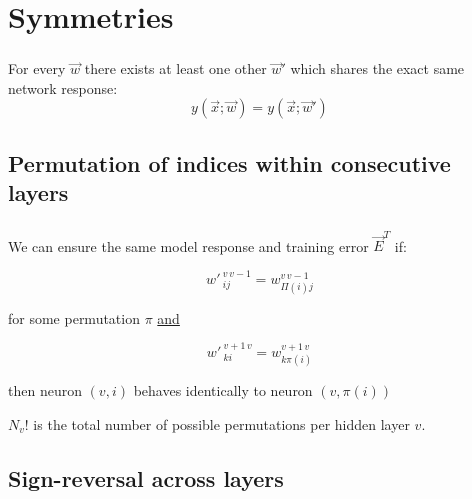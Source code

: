 \section{Symmetries}


\begin{frame}\frametitle{\secname}

For every $\vec w$ there exists at least one other $\vec w'$ which shares the exact same network response:
\begin{equation}
y(\vec x; \vec w) = y(\vec x; \vec w')
\label{eq:symmetric}
\end{equation}

  
\end{frame}

\subsection{Permutation of indices within consecutive layers}

\begin{frame}\frametitle{\subsecname}


We can ensure the same model response and training error $\vec E^{T}$ if:


\begin{equation}
{w'\,}^{v\,v-1}_{ij} = w^{v\,v-1}_{\Pi(i)j}
\end{equation}

for some permutation $\pi$ \underline{and}

\begin{equation}
{w'\,}^{v+1\,v}_{ki} = w^{v+1\,v}_{k\pi(i)}
\end{equation}

then neuron $(v, i)$ behaves identically to neuron $(v, \pi(i))${}

$N_{v}!$ is the total number of possible permutations per hidden layer $v$.

  
\end{frame}

\subsection{Sign-reversal across layers}

